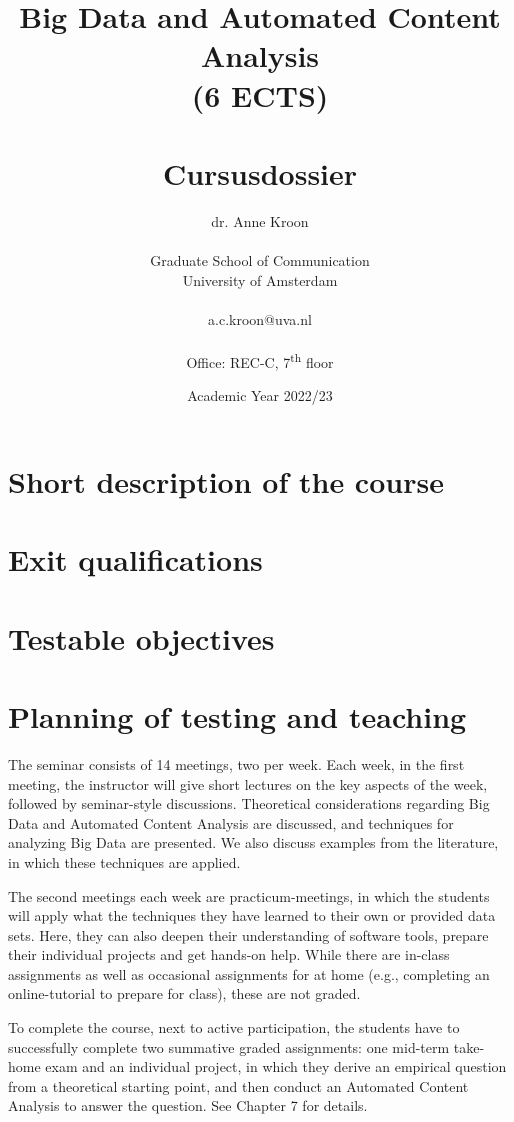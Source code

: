 \documentclass[a4paper,12pt]{report}
\title{Big Data and Automated Content Analysis\\ (6 ECTS)\\~\\Cursusdossier}
\author{dr. Anne Kroon\\~\\Graduate School of Communication\\University of Amsterdam\\~\\a.c.kroon@uva.nl\\~\\Office: REC-C, 7\textsuperscript{th} floor}
\date{Academic Year 2022/23}
\begin{document}
\maketitle

\tableofcontents


\chapter{Short description of the course}



\chapter{Exit qualifications}


\chapter{Testable objectives}


\chapter{Planning of testing and teaching}

The seminar consists of 14 meetings, two per week. Each week, in the first meeting, the instructor will give short lectures on the key aspects of the week, followed by seminar-style discussions. Theoretical considerations regarding Big Data and Automated Content Analysis are discussed, and techniques for analyzing Big Data are presented. We also discuss examples from the literature, in which these techniques are applied.


The second meetings each week are practicum-meetings, in which the students will apply what the techniques they have learned to their own or provided data sets. Here, they can also deepen their understanding of software tools, prepare their individual projects and get hands-on help. While there are in-class assignments as well as occasional assignments for at home (e.g., completing an online-tutorial to prepare for class), these are not graded.

To complete the course, next to active participation, the students have to successfully complete two summative graded assignments: one mid-term take-home exam and an individual project, in which they derive an empirical question from a theoretical starting point, and then conduct an Automated Content Analysis to answer the question. See Chapter 7 for details.
\end{document}

